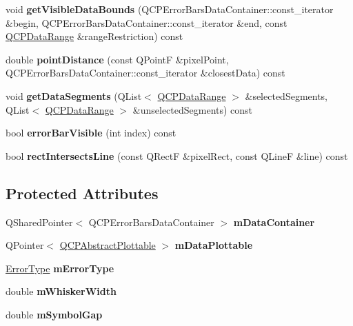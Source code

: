 \begin{DoxyCompactItemize}
void {\bfseries get\+Visible\+Data\+Bounds} (Q\+C\+P\+Error\+Bars\+Data\+Container\+::const\+\_\+iterator \&begin, Q\+C\+P\+Error\+Bars\+Data\+Container\+::const\+\_\+iterator \&end, const \hyperlink{class_q_c_p_data_range}{Q\+C\+P\+Data\+Range} \&range\+Restriction) const
\item 
\mbox{\label{class_q_c_p_error_bars_a8e904076bad643f43af28b95f21c1b88}} 
double {\bfseries point\+Distance} (const Q\+PointF \&pixel\+Point, Q\+C\+P\+Error\+Bars\+Data\+Container\+::const\+\_\+iterator \&closest\+Data) const
\item 
\mbox{\label{class_q_c_p_error_bars_a243e0bb2563fc2e9f08efd77e7175abf}} 
void {\bfseries get\+Data\+Segments} (Q\+List$<$ \hyperlink{class_q_c_p_data_range}{Q\+C\+P\+Data\+Range} $>$ \&selected\+Segments, Q\+List$<$ \hyperlink{class_q_c_p_data_range}{Q\+C\+P\+Data\+Range} $>$ \&unselected\+Segments) const
\item 
\mbox{\label{class_q_c_p_error_bars_a5ad9abccb1be3df25485ad7dc21b3b89}} 
bool {\bfseries error\+Bar\+Visible} (int index) const
\item 
\mbox{\label{class_q_c_p_error_bars_aa9b1642567a0aff8a2f6e0556c563633}} 
bool {\bfseries rect\+Intersects\+Line} (const Q\+RectF \&pixel\+Rect, const Q\+LineF \&line) const
\end{DoxyCompactItemize}
\subsection*{Protected Attributes}
\begin{DoxyCompactItemize}
\item 
\mbox{\label{class_q_c_p_error_bars_a83c7f452d0eebd302a7e4fb3a1957634}} 
Q\+Shared\+Pointer$<$ Q\+C\+P\+Error\+Bars\+Data\+Container $>$ {\bfseries m\+Data\+Container}
\item 
\mbox{\label{class_q_c_p_error_bars_a14b6a5b49295990da84a05a3a89026bb}} 
Q\+Pointer$<$ \hyperlink{class_q_c_p_abstract_plottable}{Q\+C\+P\+Abstract\+Plottable} $>$ {\bfseries m\+Data\+Plottable}
\item 
\mbox{\label{class_q_c_p_error_bars_af9fd3117b86aac728c9e8e87c406ed9a}} 
\hyperlink{class_q_c_p_error_bars_a95f0220f11a72648b96480a85ce26474}{Error\+Type} {\bfseries m\+Error\+Type}
\item 
\mbox{\label{class_q_c_p_error_bars_a3873724f7ac3392bdf9d46a47076a1d2}} 
double {\bfseries m\+Whisker\+Width}
\item 
\mbox{\label{class_q_c_p_error_bars_a5cb5628b75e5aff0875710705666ec57}} 
double {\bfseries m\+Symbol\+Gap}
\end{DoxyCompactItemize}
